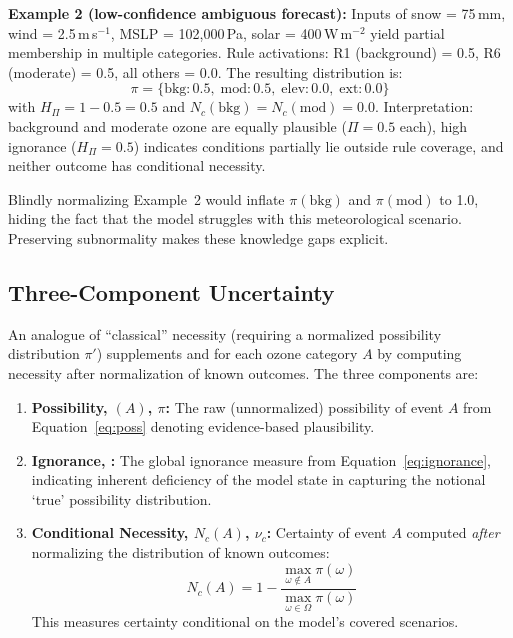 \textbf{Example 2 (low-confidence ambiguous forecast):} Inputs of snow = 75\,mm, wind = 2.5\,m\,s$^{-1}$, MSLP = 102,000\,Pa, solar = 400\,W\,m$^{-2}$ yield partial membership in multiple categories. Rule activations: R1 (background) = 0.5, R6 (moderate) = 0.5, all others = 0.0. The resulting distribution is:
\[
\pi = \{\text{bkg}: 0.5,\; \text{mod}: 0.5,\; \text{elev}: 0.0,\; \text{ext}: 0.0\}
\]
with $H_\Pi = 1 - 0.5 = 0.5$ and $N_c(\text{bkg}) = N_c(\text{mod}) = 0.0$. Interpretation: background and moderate ozone are equally plausible ($\Pi = 0.5$ each), high ignorance ($H_\Pi = 0.5$) indicates conditions partially lie outside rule coverage, and neither outcome has conditional necessity.

Blindly normalizing Example~2 would inflate $\pi(\text{bkg})$ and $\pi(\text{mod})$ to 1.0, hiding the fact that the model struggles with this meteorological scenario. Preserving subnormality makes these knowledge gaps explicit.

\subsection{Three-Component Uncertainty}\label{sec:three_component}

An analogue of ``classical'' necessity (requiring a normalized possibility distribution $\pi'$) supplements \poss{} and \ign{} for each ozone category $A$ by computing necessity after normalization of known outcomes. The three components are:

\begin{enumerate}[leftmargin=2em]
\item \textbf{Possibility, \poss{}$(A)$, $\pi$:} The raw (unnormalized) possibility of event $A$ from Equation~\eqref{eq:poss} denoting evidence-based plausibility.
\item \textbf{Ignorance, \ign{}:} The global ignorance measure from Equation~\eqref{eq:ignorance}, indicating inherent deficiency of the model state in capturing the notional `true' possibility distribution.
\item \textbf{Conditional Necessity, $N_c(A)$, $\nu_c$:} Certainty of event $A$ computed \textit{after} normalizing the distribution of known outcomes:
\begin{equation}
N_c(A) = 1 - \frac{\max_{\omega \notin A} \pi(\omega)}{\max_{\omega \in \Omega} \pi(\omega)} \label{eq:cond_nec}
\end{equation}
This measures certainty conditional on the model's covered scenarios.
\end{enumerate}

